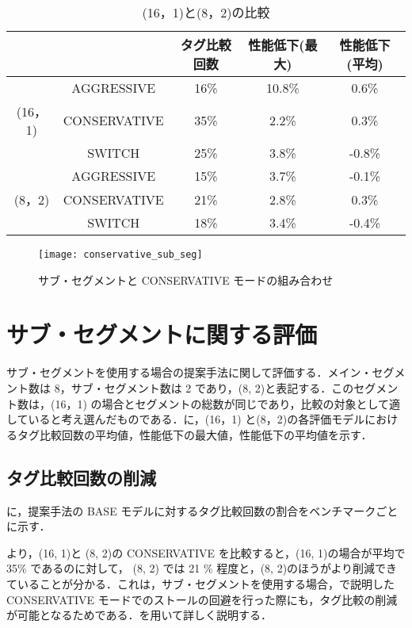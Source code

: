\begin{table}[htb]
  \caption{(16，1)と(8，2)の比較}
  \footnotesize
  \center
    \begin{tabular}{cc|c|c|c} \hline \hline
     & & タグ比較回数 & 性能低下(最大) & 性能低下(平均)\\\hline
     & AGGRESSIVE  & 16\%  & 10.8\% & 0.6\% \\
    (16，1) & CONSERVATIVE & 35\% & 2.2\% & 0.3\% \\ \
     & SWITCH & 25\% & 3.8\% & -0.8\% \\ \hline
     & AGGRESSIVE & 15\% & 3.7\% & -0.1\% \\
    (8，2) & CONSERVATIVE & 21\% & 2.8\% & 0.3\% \\ 
     & SWITCH & 18\% & 3.4\% & -0.4\% \\ \hline
  \end{tabular}
  \label{tab:subseg_eval}
\end{table}

\begin{figure}[htb]
  \centering
  \texttt{[image: conservative\_sub\_seg]}
  \caption{サブ・セグメントと CONSERVATIVE モードの組み合わせ}
  \label{fig:conservative_sub_seg}
\end{figure}

\section{サブ・セグメントに関する評価}
サブ・セグメントを使用する場合の提案手法に関して評価する．メイン・セグメント数は 8，サブ・セグメント数は 2 であり，(8, 2)と表記する．このセグメント数は，(16，1) の場合とセグメントの総数が同じであり，比較の対象として適していると考え選んだものである．に，(16，1) と(8，2)の各評価モデルにおけるタグ比較回数の平均値，性能低下の最大値，性能低下の平均値を示す．

\subsection{タグ比較回数の削減}
に，提案手法の BASE モデルに対するタグ比較回数の割合をベンチマークごとに示す．

 より，(16, 1)と (8, 2)の CONSERVATIVE を比較すると，(16, 1)の場合が平均で 35\% であるのに対して， (8, 2) では 21 \% 程度と，(8, 2)のほうがより削減できていることが分かる．これは，サブ・セグメントを使用する場合，で説明した CONSERVATIVE モードでのストールの回避を行った際にも，タグ比較の削減が可能となるためである．を用いて詳しく説明する．


